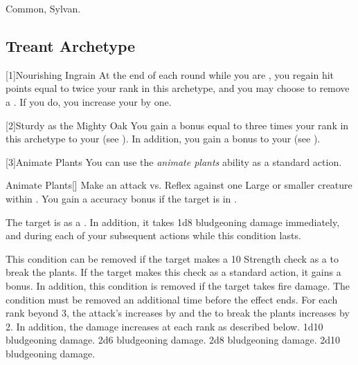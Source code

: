      Common, Sylvan.

    \subsection{Treant Archetype}

        [1]{Nourishing Ingrain} At the end of each round while you are , you regain hit points equal to twice your rank in this archetype, and you may choose to remove a .
        If you do, you increase your  by one.

        [2]{Sturdy as the Mighty Oak} You gain a bonus equal to three times your rank in this archetype to your  (see ).
        In addition, you gain a  bonus to your  (see ).

        [3]{Animate Plants} You can use the \textit{animate plants} ability as a standard action.
        \begin{activeability}{Animate Plants}[]
            \rankline
            Make an attack vs. Reflex against one Large or smaller  creature within \medrange.
            You gain a  accuracy bonus if the target is in .

            \hit The target is \slowed as a .
            In addition, it takes 1d8 bludgeoning damage immediately, and during each of your subsequent actions while this condition lasts.

            This condition can be removed if the target makes a  10 Strength check as a  to break the plants.
            If the target makes this check as a standard action, it gains a  bonus.
            In addition, this condition is removed if the target takes fire damage.
            \crit The condition must be removed an additional time before the effect ends.
            \rankline
            For each rank beyond 3, the attack's  increases by  and the  to break the plants increases by 2.
            In addition, the damage increases at each rank as described below.
             1d10 bludgeoning damage.
             2d6 bludgeoning damage.
             2d8 bludgeoning damage.
             2d10 bludgeoning damage.
        \end{activeability}

